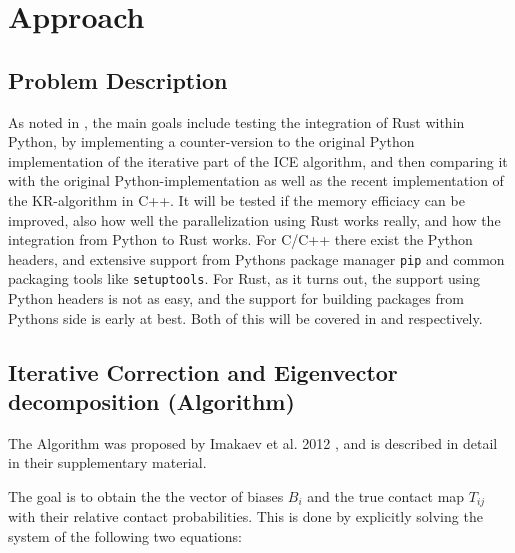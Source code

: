 \chapter{Approach}\label{chap:approach}



\section{Problem Description}\label{sec:problem}

As noted in , the main goals include testing the integration
of Rust within Python, by implementing a counter-version to the original Python
implementation of the iterative part of the ICE algorithm, and then comparing
it with the original Python-implementation as well as the recent implementation
of the KR-algorithm in C++. It will be tested if the memory efficiacy can be
improved, also how well the parallelization using Rust works really, and how
the integration from Python to Rust works. For C/C++ there exist the Python
headers, and extensive support from Pythons package manager \verb|pip| and
common packaging tools like \verb|setuptools|. For Rust, as it turns out, the
support using Python headers is not as easy, and the support for building packages
from Pythons side is early at best. Both of this will be covered in
 and  respectively.





\section{Iterative Correction and Eigenvector decomposition (Algorithm)}\label{sec:ICE}

The Algorithm was proposed by Imakaev et al. 2012 \cite{imakaev2012iterative},
and is described in detail in their supplementary material.

The goal is to obtain the the vector of biases $B_i$ and the true contact map
$T_{ij}$ with their relative contact probabilities. This is done by explicitly
solving the system of the following two equations:

